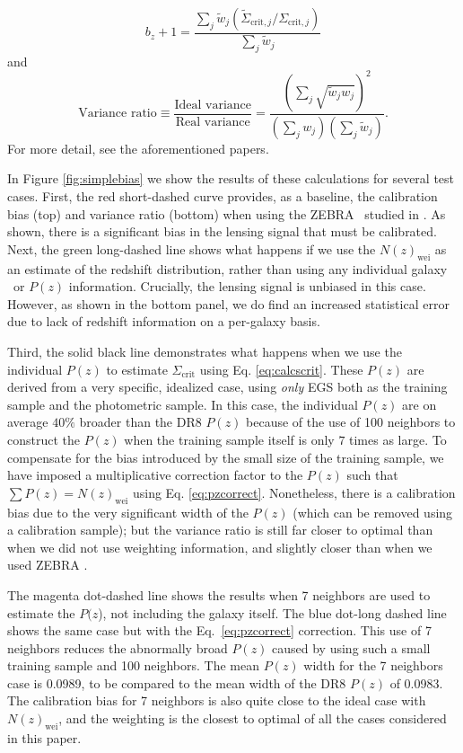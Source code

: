 \documentclass[preprint]{aastex}
\newcommand{\pofz}{$P(z$)}
\begin{document}
\noindent
\begin{equation} \label{eq:lensbias}
b_z + 1 = \frac{\sum_j \tilde{w}_j (\tilde{\Sigma}_{\mathrm{crit},j}
   / \Sigma_{\mathrm{crit},j})}{\sum_j \tilde{w}_j}
\end{equation}
and
\begin{equation} \label{eq:lensweight}
\textrm{Variance ratio}  \equiv \frac{\textrm{Ideal variance}}{\textrm{Real
     variance}} = \frac{(\sum_j \sqrt{\tilde{w}_j w_j})^2}{(\sum_j
     w_j)(\sum_j \tilde{w}_j)}.
\end{equation}
For more detail, see the aforementioned papers.

In Figure \ref{fig:simplebias} we show the results of these calculations for
several test cases.  First, the red short-dashed curve provides, as a baseline,
the calibration bias (top) and variance ratio (bottom) when using the ZEBRA
\photoz\ studied in \citet{Nakajima11}.  As shown, there is a
significant bias in the lensing signal that must be calibrated.
Next, the green long-dashed line shows what happens if we use the
$N(z)_\mathrm{wei}$ as an estimate of the redshift distribution, rather than
using any individual galaxy \photoz\ or $P(z)$ information.  Crucially, the
lensing signal is unbiased in this case. However, as shown in the bottom
panel, we do find an increased
statistical error due to lack of redshift information on a per-galaxy basis.

Third, the solid black line demonstrates what happens when we use the individual
$P(z)$ to estimate $\Sigma_\mathrm{crit}$ using Eq. \ref{eq:calcscrit}.  These
$P(z)$ are derived from a very specific, idealized case, using {\em only} EGS
both as the training sample and the photometric sample.  In this case, the
individual $P(z)$ are on average $40\%$ broader than the DR8 $P(z)$ because of
the use of 100 neighbors to construct the $P(z)$ when the training sample
itself is only $7$ times as large.  To compensate for the bias introduced by
the small size of the training sample, we have imposed a multiplicative
correction factor to the $P(z)$ such that $\sum P(z) = N(z)_\mathrm{wei}$ using
Eq. \ref{eq:pzcorrect}.  Nonetheless, there is a calibration bias due to the
very significant width of the $P(z)$ (which can be removed using a calibration
sample); but the variance ratio is still far closer to optimal than when we did
not use weighting information, and slightly closer than when we used ZEBRA
\photoz.  

The magenta dot-dashed line shows the results when 7 neighbors are used to
estimate the \pofz, not including the galaxy itself. The blue dot-long dashed
line shows the same case but with the Eq.~\ref{eq:pzcorrect} correction.  This
use of 7 neighbors reduces the abnormally broad $P(z)$ caused by using such a
small training sample and 100 neighbors.  The mean $P(z)$ width for the 7
neighbors case is 0.0989, to be compared to the mean width of the DR8 $P(z)$ of
0.0983. The calibration bias for 7 neighbors is also quite close to the ideal
case with $N(z)_\mathrm{wei}$, and the weighting is the closest to optimal of
all the cases considered in this paper.
\end{document}

